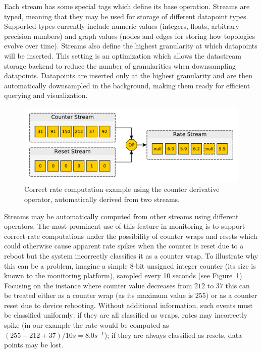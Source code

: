 \documentclass[5p,sort&compress]{elsarticle}
\begin{document}
Each stream has some special tags which define its base operation.
Streams are typed, meaning that they may be used for storage of different datapoint types.
Supported types currently include numeric values (integers, floats, arbitrary precision numbers) and graph values (nodes and edges for storing how topologies evolve over time).
Streams also define the highest granularity at which datapoints will be inserted.
This setting is an optimization which allows the datastream storage backend to reduce the number of granularities when downsampling datapoints.
Datapoints are inserted only at the highest granularity and are then automatically downsampled in the background, making them ready for efficient querying and visualization.

\begin{figure}
  \centering
  \includegraphics[scale=0.4]{figures/datastream-counter-reset.pdf}
  \caption{Correct rate computation example using the counter derivative operator, automatically derived from two streams.}
  \label{fig:datastream-counter-reset}
\end{figure}

Streams may be automatically computed from other streams using different operators.
The most prominent use of this feature in monitoring is to support correct rate computations under the possibility of counter wraps and resets which could otherwise cause apparent rate spikes when the counter is reset due to a reboot but the system incorrectly classifies it as a counter wrap.
To illustrate why this can be a problem, imagine a simple 8-bit unsigned integer counter (its size is known to the monitoring platform), sampled every 10 seconds (see Figure~\ref{fig:datastream-counter-reset}).
Focusing on the instance where counter value decreases from $212$ to $37$ this can be treated either as a counter wrap (as its maximum value is $255$) or as a counter reset due to device rebooting.
Without additional information, such events must be classified uniformly: if they are all classified as wraps, rates may incorrectly spike (in our example the rate would be computed as $(255 - 212 + 37) / 10s = 8.0s^{-1}$); if they are always classified as resets, data points may be lost.
\end{document}
